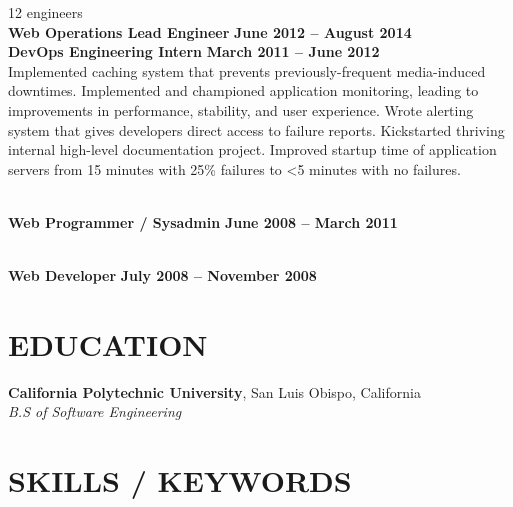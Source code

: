 \documentclass[margin,line]{resume}
\begin{document}
\begin{resume}
     \hfill {\selectfont\texttildelow}12 engineers
    \vspace{1mm}\\%
    \textbf{Web Operations Lead Engineer} \hfill \textbf{June 2012 -- August 2014}\\
    \textbf{DevOps Engineering Intern} \hfill \textbf{March 2011 -- June 2012}\\
    Implemented caching system that prevents previously-frequent media-induced downtimes.
    Implemented and championed application monitoring, leading to improvements in performance, stability, and user experience.
    Wrote alerting system that gives developers direct access to failure reports.
    Kickstarted thriving internal high-level documentation project.
    Improved startup time of application servers from 15 minutes with 25\% failures to \textless5 minutes with no failures.

     \vspace{1mm}\\%
    \textbf{Web Programmer / Sysadmin} \hfill \textbf{June 2008 -- March 2011}

     \vspace{1mm}\\%
    \textbf{Web Developer} \hfill \textbf{July 2008 -- November 2008}

\sectionline

    \section{\mysidestyle \textbf{\large{E}\small{DUCATION}}}

    \textbf{\listing California Polytechnic University}, San Luis Obispo, California \vspace{1mm}\\
    \textsl{B.S of Software Engineering} \vspace{-3mm}\\\vspace{-1mm}%

\pagebreak
\sectionline
    \section{\mysidestyle \textbf{\large{S}\small{KILLS} / \large{K}\small{EYWORDS}}}


\end{resume}
\end{document}

